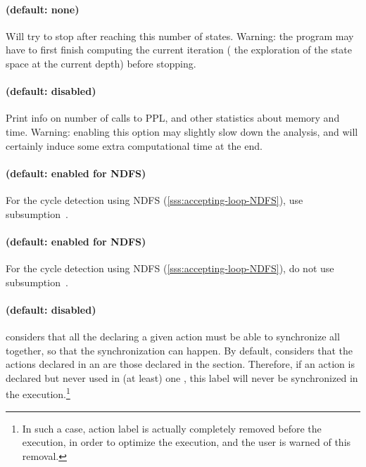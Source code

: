 \paragraph{ (default: none)}
Will try to stop after reaching this number of states.
Warning: the program may have to first finish computing the current iteration (\ie{} the exploration of the state space at the current depth) before stopping.


\paragraph{ (default: disabled)}
Print info on number of calls to PPL, and other statistics about memory and time.
Warning: enabling this option may slightly slow down the analysis, and will certainly induce some extra computational time at the end.



\paragraph{ (default: enabled for NDFS)}
For the cycle detection using NDFS (\cref{sss:accepting-loop-NDFS}), use subsumption~\cite{NPP18}.


\paragraph{ (default: enabled for NDFS)}
For the cycle detection using NDFS (\cref{sss:accepting-loop-NDFS}), do not use subsumption~\cite{NPP18}.


\paragraph{ (default: disabled)}
\imitator{} considers that all the \IPTA{} declaring a given action must be able to synchronize all together, so that the synchronization can happen.
By default, \imitator{} considers that the actions declared in an \IPTA{} are those declared in the  section.
Therefore, if an action is declared but never used in (at least) one \IPTA{}, this label will never be synchronized in the execution.\footnote{In such a case, action label is actually completely removed before the execution, in order to optimize the execution, and the user is warned of this removal.}

